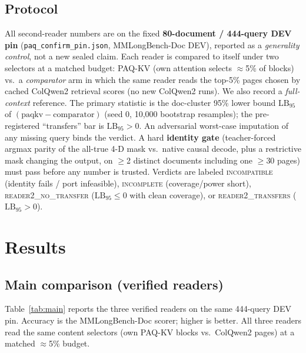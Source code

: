 \documentclass[letterpaper]{article} %
\newcommand{\paqc}{\textsc{PAQ-KV}}
\newcommand{\lb}{\mathrm{LB}_{95}}
\begin{document}
\subsection{Protocol}
\label{sec:protocol}
All second-reader numbers are on the fixed \textbf{80-document / 444-query DEV pin} (\texttt{paq\_confirm\_pin.json},
MMLongBench-Doc DEV), reported as a \emph{generality control}, not a new sealed claim. Each reader is compared to
itself under two selectors at a matched budget: \paqc{} (own attention selects $\approx$5\% of blocks) vs.\ a
\emph{comparator} arm in which the same reader reads the top-5\% pages chosen by cached ColQwen2 retrieval scores
(no new ColQwen2 runs). We also record a \emph{full-context} reference. The primary statistic is the doc-cluster
95\% lower bound $\lb$ of $(\textrm{paqkv}-\textrm{comparator})$ (seed 0, 10{,}000 bootstrap resamples); the
pre-registered ``transfers'' bar is $\lb>0$. An adversarial worst-case imputation of any missing query binds the
verdict. A hard \textbf{identity gate} (teacher-forced argmax parity of the all-true 4-D mask vs.\ native causal
decode, plus a restrictive mask changing the output, on $\geq$2 distinct documents including one $\geq$30 pages) must
pass before any number is trusted. Verdicts are labeled \textsc{incompatible} (identity fails / port infeasible),
\textsc{incomplete} (coverage/power short), \textsc{reader2\_no\_transfer} ($\lb\leq 0$ with clean coverage), or
\textsc{reader2\_transfers} ($\lb>0$).

\section{Results}
\label{sec:results}

\subsection{Main comparison (verified readers)}
Table~\ref{tab:main} reports the three verified readers on the same 444-query DEV pin. Accuracy is the MMLongBench-Doc
scorer; higher is better. All three readers read the same content selectors (own \paqc{} blocks vs.\ ColQwen2 pages)
at a matched $\approx$5\% budget.
\end{document}
